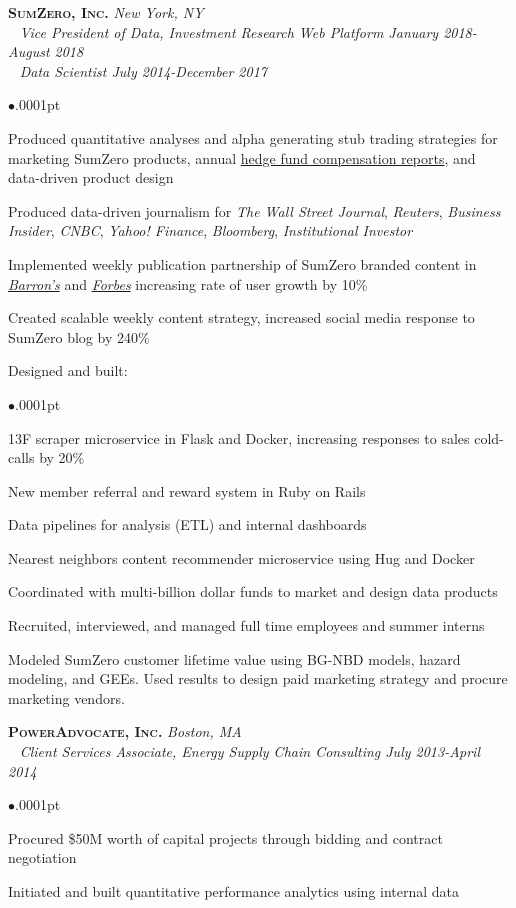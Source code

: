 \documentclass[11pt]{article}
\newcommand{\employer}[4]{
	{\hspace*{-20pt} {\small{\textbf{\textsc{ #1}}}}
  \hfill \small{\emph{#2}}\\ ~\hspace*{-20pt} \small \emph{ #3 \hfill #4}}\\ }
\newcommand{\position}[2]
	{ ~\hspace*{-20pt} \small \emph{ #1 \hfill #2}}
\newenvironment{achievements}{\begin{list}{$\bullet$}{\topsep .0001pt \itemsep -2pt}}{\vspace*{5pt}\end{list} }
\begin{document}
\employer{SumZero, Inc.}{New York, NY}{Vice President of Data, Investment Research Web Platform}{January 2018-August 2018}
\position{Data Scientist}{July 2014-December 2017}
	\begin{achievements}
		\item Produced quantitative analyses and alpha generating stub trading strategies for marketing SumZero products, annual \href{https://sumzero.com/sp/szcomp2017}{hedge fund compensation reports}, and data-driven product design 
		\item Produced data-driven journalism for \emph{The Wall Street Journal}, \emph{Reuters}, \emph{Business Insider}, \emph{CNBC}, \emph{Yahoo! Finance}, \emph{Bloomberg}, \emph{Institutional Investor}
		\item Implemented weekly publication partnership of SumZero branded content in \href{http://www.barrons.com/search?keyword=view+from+the+buyside+sumzero&numResults=15&sort=date-desc&author=&searchWindow=0&minDate=&maxDate=&source=barrons}{\emph{Barron's}} and \href{https://www.forbes.com/sites/lukeschiefelbein/#7442bc65216e}{\emph{Forbes}} increasing rate of user growth by 10\%
		\item Created scalable weekly content strategy, increased social media response to SumZero blog by 240\%
		\item Designed and built:
		\begin{achievements}
		\item 13F scraper microservice in Flask and Docker, increasing responses to sales cold-calls by 20\%
		\item New member referral and reward system in Ruby on Rails
		\item Data pipelines for analysis (ETL) and internal dashboards
		\item Nearest neighbors content recommender microservice using Hug and Docker
		\end{achievements}
		\item Coordinated with multi-billion dollar funds to market and design data products
		\item Recruited, interviewed, and managed full time employees and summer interns
		\item Modeled SumZero customer lifetime value using BG-NBD models, hazard modeling, and GEEs. Used results to design paid marketing strategy and procure marketing vendors.
	\end{achievements}

\employer{PowerAdvocate, Inc.} {Boston, MA} {Client Services Associate, Energy Supply Chain Consulting} {July 2013-April 2014}
	\begin{achievements}
		\item Procured \$50M worth of capital projects through bidding and contract negotiation
		\item Initiated and built quantitative performance analytics using internal data 
	\end{achievements}
\end{document}
